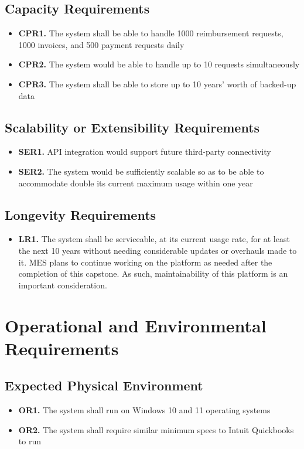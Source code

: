 \documentclass[12pt]{article}
\begin{document}
\subsection{Capacity Requirements}
\begin{itemize}
    \item \textbf{CPR1.} The system shall be able to handle 1000 reimbursement requests, 1000 invoices, and 500 payment requests daily
    \item \textbf{CPR2.} The system would be able to handle up to 10 requests simultaneously
    \item \textbf{CPR3.} The system shall be able to store up to 10 years’ worth of backed-up data
\end{itemize}

\subsection{Scalability or Extensibility Requirements}
\begin{itemize}
    \item \textbf{SER1.} API integration would support future third-party connectivity
    \item \textbf{SER2.} The system would be sufficiently scalable so as to be able to accommodate double its current maximum usage within one year
\end{itemize}

\subsection{Longevity Requirements}
\begin{itemize}
    \item \textbf{LR1.} The system shall be serviceable, at its current usage rate, for at least the next 10 years without needing considerable updates or overhauls made to it. MES plans to continue working on the platform as needed after the completion of this capstone. As such, maintainability of this platform is an important consideration.
\end{itemize}

\section{Operational and Environmental Requirements}
\subsection{Expected Physical Environment}
\begin{itemize}
    \item \textbf{OR1.} The system shall run on Windows 10 and 11 operating systems 
    \item \textbf{OR2.} The system shall require similar minimum specs to Intuit Quickbooks to run
\end{itemize}
\end{document}
